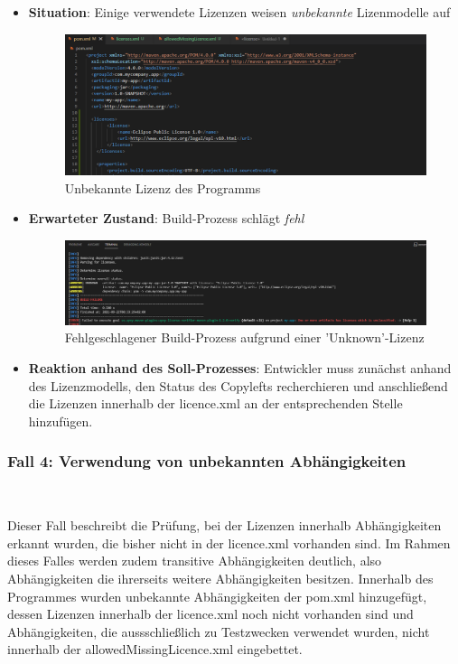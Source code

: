 \newpage
\begin{itemize}
    \item \textbf{Situation}: Einige verwendete Lizenzen weisen \textit{unbekannte} Lizenmodelle auf
    
    \begin{figure}[h]
        \centering
        \includegraphics[scale=0.5]{Bilder/Fall3Situation.png}
        \caption{Unbekannte Lizenz des Programms}
    \end{figure}

    \item \textbf{Erwarteter Zustand}: Build-Prozess schlägt \textit{fehl} 
    
    \begin{figure}[h]
        \centering
        \includegraphics[scale=0.4]{Bilder/Fall3Zustand.png}
        \caption{Fehlgeschlagener Build-Prozess aufgrund einer 'Unknown'-Lizenz}
    \end{figure}

    \item \textbf{Reaktion anhand des Soll-Prozesses}: Entwickler muss zunächst anhand des Lizenzmodells, den Status des Copylefts recherchieren und anschließend die Lizenzen innerhalb der licence.xml an der entsprechenden Stelle hinzufügen. 
\end{itemize}

\subsubsection{Fall 4: Verwendung von unbekannten Abhängigkeiten} $~$

Dieser Fall beschreibt die Prüfung, bei der Lizenzen innerhalb Abhängigkeiten erkannt wurden, die bisher nicht in der licence.xml vorhanden sind. Im Rahmen dieses Falles werden zudem transitive Abhängigkeiten deutlich, also Abhängigkeiten die ihrerseits weitere Abhängigkeiten besitzen. Innerhalb des Programmes wurden unbekannte Abhängigkeiten der pom.xml hinzugefügt, dessen Lizenzen innerhalb der licence.xml noch nicht vorhanden sind und Abhängigkeiten, die aussschließlich zu Testzwecken verwendet wurden, nicht innerhalb der allowedMissingLicence.xml eingebettet. 

